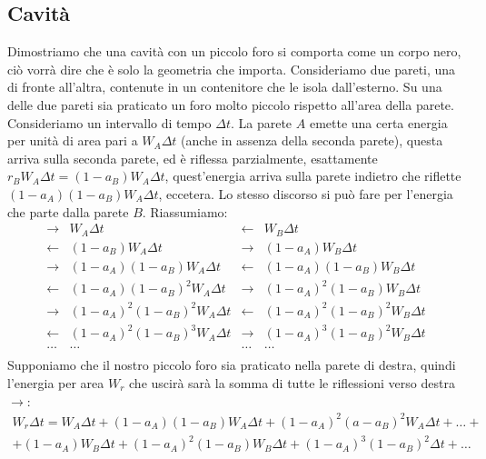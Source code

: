 \subsection{Cavità}
Dimostriamo che una cavità con un piccolo foro si comporta come un corpo nero, ciò vorrà dire che è solo la geometria che importa. Consideriamo due pareti, una di fronte all'altra, contenute in un contenitore che le isola dall'esterno. Su una delle due pareti sia praticato un foro molto piccolo rispetto all'area della parete. Consideriamo un intervallo di tempo $\Delta t$. La parete $A$ emette una certa energia per unità di area pari a $W_A\Delta t$ (anche in assenza della seconda parete), questa arriva sulla seconda parete, ed è riflessa parzialmente, esattamente $r_BW_A\Delta t=(1-a_B)W_A\Delta t$, quest'energia arriva sulla parete indietro che riflette $(1-a_A)(1-a_B)W_A\Delta t$, eccetera. Lo stesso discorso si può fare per l'energia che parte dalla parete $B$. Riassumiamo:
\begin{equation}
	\begin{array}{cl|cl}
		\rightarrow & W_A\Delta t                   & \leftarrow  & W_B\Delta t                   \\
		\leftarrow  & (1-a_B)W_A\Delta t            & \rightarrow & (1-a_A)W_B\Delta t            \\
		\rightarrow & (1-a_A)(1-a_B)W_A\Delta t     & \leftarrow  & (1-a_A)(1-a_B)W_B\Delta t     \\
		\leftarrow  & (1-a_A)(1-a_B)^2W_A\Delta t   & \rightarrow & (1-a_A)^2(1-a_B)W_B\Delta t   \\
		\rightarrow & (1-a_A)^2(1-a_B)^2W_A\Delta t & \leftarrow  & (1-a_A)^2(1-a_B)^2W_B\Delta t \\
		\leftarrow  & (1-a_A)^2(1-a_B)^3W_A\Delta t & \rightarrow & (1-a_A)^3(1-a_B)^2W_B\Delta t \\
		\ldots      & \ldots                        & \ldots      & \ldots                        \\
	\end{array}
\end{equation}
Supponiamo che il nostro piccolo foro sia praticato nella parete di destra, quindi l'energia per area $W_r$ che uscirà sarà la somma di tutte le riflessioni verso destra $\rightarrow$:
\begin{multline}
	W_r\Delta t=W_A\Delta t+(1-a_A)(1-a_B)W_A\Delta t+(1-a_A)^2(a-a_B)^2W_A\Delta t+\ldots+\\+(1-a_A)W_B\Delta t+(1-a_A)^2(1-a_B)W_B\Delta t+(1-a_A)^3(1-a_B)^2\Delta t+\ldots
\end{multline}
